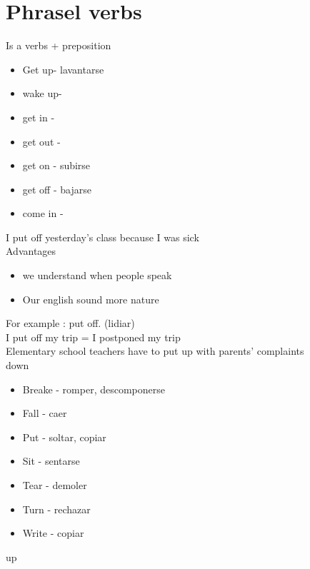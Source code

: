 \documentclass{article}
\begin{document}
    \section{Phrasel verbs}
    Is a verbs + preposition 
    \begin{itemize}
        \item Get up- lavantarse 
        \item wake up- 
        \item get in - 
        \item get out - 
        \item get on - subirse
        \item get off - bajarse 
        \item come in - 
    \end{itemize}
    I put off yesterday's class because I was sick 
    \\
    Advantages
    \begin{itemize}
        \item we understand when people speak
        \item Our english sound more nature
    \end{itemize}
    For example : put off. (lidiar) \\ 
    I put off my trip = I postponed my trip \\
    Elementary school teachers have to put up with parents' complaints
    \\ 
    down 
    \begin{itemize}
        \item Breake - romper, descomponerse
        \item Fall - caer
        \item Put - soltar, copiar
        \item Sit - sentarse
        \item Tear - demoler
        \item Turn - rechazar 
        \item Write - copiar
    \end{itemize}
    up 
\end{document}
